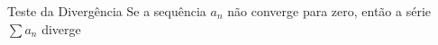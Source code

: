 \begin{frame}{Teste da Divergência}
	Se a sequência $a_n$ não converge para zero, então a série $\sum a_n$ diverge
\end{frame}

\begin{frame}{\contentsname}
  \tableofcontents
\end{frame}



